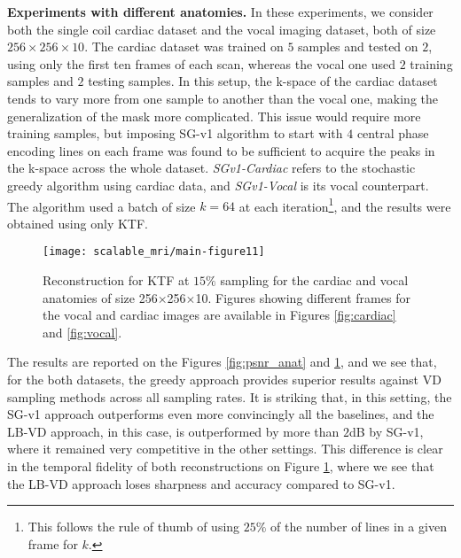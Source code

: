 \textbf{Experiments with different anatomies.} In these experiments, we consider both the single coil cardiac dataset and the vocal imaging dataset, both of size $256\times 256 \times 10$. The cardiac dataset was trained on $5$ samples and tested on $2$, using only the first ten frames of each scan, whereas the vocal one used $2$ training samples and $2$ testing samples. In this setup, the k-space of the cardiac dataset tends to vary more from one sample to another than the vocal one, making the generalization of the mask more complicated. This issue would require more training samples, but imposing SG-v1 algorithm to start with $4$ central phase encoding lines on each frame was found to be sufficient to acquire the peaks in the k-space across the whole dataset. \textit{SGv1-Cardiac} refers to the stochastic greedy algorithm using cardiac data, and \textit{SGv1-Vocal} is its vocal counterpart. The algorithm used a batch of size $k = 64$ at each iteration\footnote{This follows the rule of thumb of using $25\%$ of the number of lines in a given frame for $k$.}, and the results were obtained using only KTF.

\begin{figure}[!ht]
    \centering
    \vspace{1.5cm}
    \texttt{[image: scalable\_mri/main-figure11]}
    \caption{Reconstruction for KTF at $15\%$ sampling for the cardiac and vocal anatomies of size 256$\times$256$\times$10. Figures showing different frames for the vocal and cardiac images are available in Figures \ref{fig:cardiac} and \ref{fig:vocal}.}\label{fig:plot_cross_anat}
    \vspace{1.5cm}
\end{figure}

The results are reported on the Figures \ref{fig:psnr_anat} and \ref{fig:plot_cross_anat}, and we see that, for the both datasets, the greedy approach provides superior results against VD sampling methods across all sampling rates. It is striking that, in this setting, the SG-v1 approach outperforms even more convincingly all the baselines, and the LB-VD approach, in this case, is outperformed by more than $2$dB by SG-v1, where it remained very competitive in the other settings. This difference is clear in the temporal fidelity of both reconstructions on Figure \ref{fig:plot_cross_anat}, where we see that the LB-VD approach loses sharpness and accuracy compared to SG-v1.




